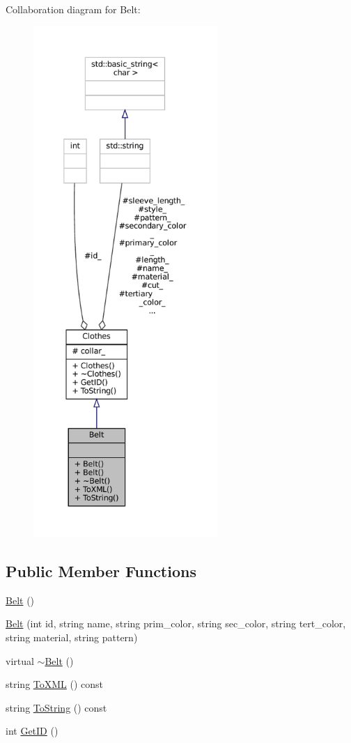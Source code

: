 Collaboration diagram for Belt\+:\nopagebreak
\begin{figure}[H]
\begin{center}
\leavevmode
\includegraphics[height=550pt]{classBelt__coll__graph}
\end{center}
\end{figure}
\subsection*{Public Member Functions}
\begin{DoxyCompactItemize}
\item 
\mbox{\hyperlink{classBelt_a6dc40c21b5a62c71925df189511d7551}{Belt}} ()
\item 
\mbox{\hyperlink{classBelt_a2a8b481a0fe80916513dbd5cf1f03127}{Belt}} (int id, string name, string prim\+\_\+color, string sec\+\_\+color, string tert\+\_\+color, string material, string pattern)
\item 
virtual \mbox{\hyperlink{classBelt_a671f01a32839b9391d75ae3bb0b7f8cc}{$\sim$\+Belt}} ()
\item 
string \mbox{\hyperlink{classBelt_a69b84739e63f35afa5dacf6f3ce0d731}{To\+X\+ML}} () const
\item 
string \mbox{\hyperlink{classBelt_af09e2b5e51b7603ec5dede2e6b0a753f}{To\+String}} () const
\item 
int \mbox{\hyperlink{classClothes_a3f6dac172f333126d19010f85ec44e4c}{Get\+ID}} ()
\end{DoxyCompactItemize}

